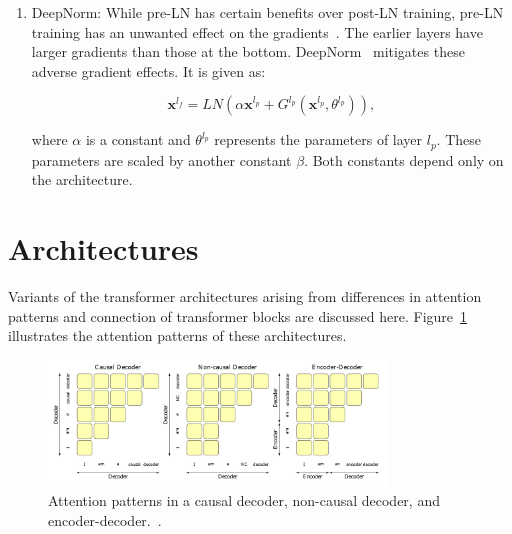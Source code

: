 \documentclass[a4paper,oneside]{book}
\begin{document}
\begin{enumerate}
    \item DeepNorm: While pre-LN has certain benefits over post-LN training, pre-LN training has an unwanted effect on the gradients~\cite{shleifer2021normformer}. The earlier layers have larger gradients than those at the bottom. DeepNorm~\cite{wang2022deepnet} mitigates these adverse gradient effects. It is given as:

    \begin{equation}
        \mathbf{x}^{l_{f}} = LN\left(\alpha \mathbf{x}^{l_{p}}+G^{l_{p}}\left(\mathbf{x}^{l_{p}}, \theta^{l_{p}}\right)\right),
    \end{equation}

    where $\alpha$ is a constant and $\theta^{l_{p}}$ represents the parameters of layer $l_{p}$. These parameters are scaled by another constant $\beta$. Both constants depend only on the architecture.
\end{enumerate}

\section{Architectures}
Variants of the transformer architectures arising from differences in attention patterns and connection of transformer blocks are discussed here. Figure~\ref{fig:attention_patterns} illustrates the attention patterns of these architectures.

\begin{figure}[H]
    \centering
    \includegraphics[width=0.8\textwidth]{img/attention_patterns.png}
    \caption{Attention patterns in a causal decoder, non-causal
    decoder, and encoder-decoder.~\cite{wang2022language}.}\label{fig:attention_patterns}
\end{figure}
\end{document}
